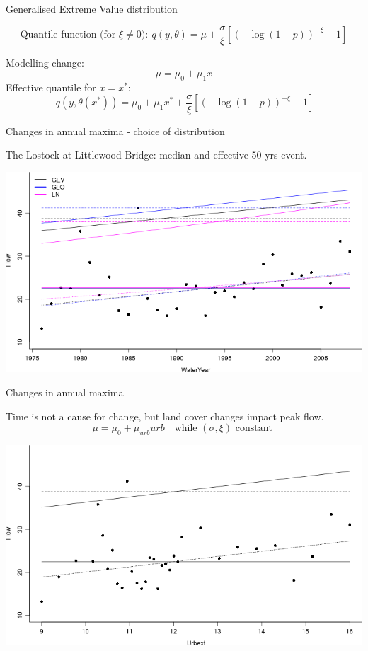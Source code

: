 \documentclass[
  10pt,
  ignorenonframetext,
  compress]{beamer}
\begin{document}
\begin{frame}{Generalised Extreme Value distribution}
\protect\hypertarget{generalised-extreme-value-distribution-1}{}

\[\text{Quantile function (for $\xi \neq 0$)}: \ q(y, \theta) = \mu + \frac{\sigma}{\xi} \left[(-\log(1-p))^{-\xi} -1 \right] \]

\pause

Modelling change: \[ \mu = \mu_0+\mu_1 x\] \pause  Effective quantile
for \(x=x^*\):
\[\ q(y, \theta(x^*)) = \mu_0+\mu_1 x^* + \frac{\sigma}{\xi} \left[(-\log(1-p))^{-\xi} -1 \right] \]

\end{frame}

\begin{frame}{Changes in annual maxima - choice of distribution}
\protect\hypertarget{changes-in-annual-maxima---choice-of-distribution}{}

The Lostock at Littlewood Bridge: median and effective 50-yrs event.

\includegraphics{ProsdocimiPerugia_files/figure-beamer/allRetsPlots-1.png}

\end{frame}

\begin{frame}{Changes in annual maxima}
\protect\hypertarget{changes-in-annual-maxima}{}

Time is not a cause for change, but land cover changes impact peak
flow.\\
\[\mu=\mu_0 + \mu_{urb} urb \quad \text{while } (\sigma, \xi)  \text{ constant }\]
\vspace{-1.2cm}

\includegraphics{ProsdocimiPerugia_files/figure-beamer/urbextRetPlot-1.png}

\end{frame}
\end{document}
